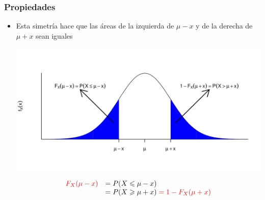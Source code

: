 \documentclass[handout]{beamer}\usepackage[]{graphicx}\usepackage[]{color}
\newcommand{\red}[1]{\textcolor{red}{#1}}
\renewcommand{\leq}{\leqslant}
\renewcommand{\geq}{\geqslant}
\theoremstyle{plain}
\theoremstyle{definition}
\begin{document}
%
%
%

\begin{frame}
\frametitle{Propiedades} 
\begin{itemize}
\item Esta simetría hace que las áreas  de la izquierda de $\mu-x$ y de la  derecha de $\mu+x$ sean iguales

\begin{center}
\includegraphics[width=\linewidth]{simnorm1}
\end{center}
\vspace*{-1.5cm}

$$
\begin{array}{rl}
\red{F_{X}(\mu-x)} & =P(X\leq \mu-x)\\ &
=P(X\geq \mu+x) \red{{} =1-F_{X}(\mu+x)}
\end{array}
$$
\end{itemize}
\end{frame}
\end{document}

